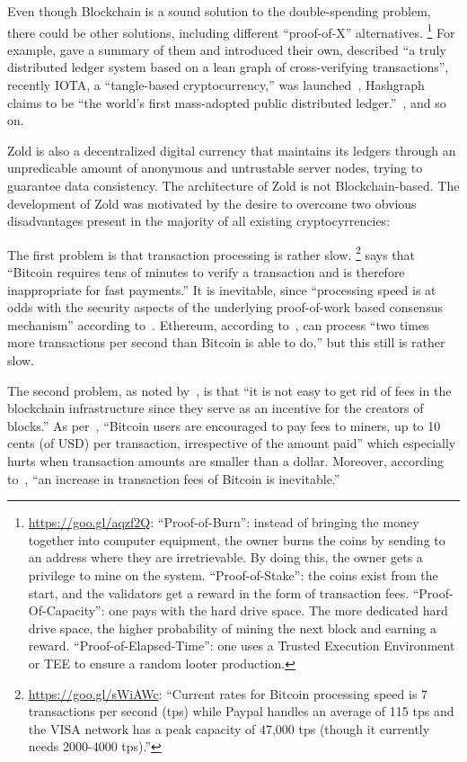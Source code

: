 \documentclass[11pt,oneside]{article}
\begin{document}
Even though Blockchain is a sound solution to the double-spending
problem, there could be other solutions,
including different ``proof-of-X'' alternatives.%
\footnote{%
  \url{https://goo.gl/aqzf2Q}:
  ``Proof-of-Burn'': instead of bringing the money together into computer equipment,
  the owner burns the coins by sending to an address where they are
  irretrievable. By doing this, the owner gets a privilege to
  mine on the system.
  ``Proof-of-Stake'': the coins exist from the start, and
  the validators get a reward in the form of transaction fees.
  ``Proof-Of-Capacity'': one pays with the hard drive space. The more
  dedicated hard drive space, the higher probability of mining
  the next block and earning a reward.
  ``Proof-of-Elapsed-Time'': one uses a Trusted Execution Environment or TEE
  to ensure a random looter production.
}
For example, \textcite{everaere2010} gave
a summary of them and introduced their own,
\textcite{boyen2016} described
``a truly distributed ledger system based on a lean graph of cross-verifying transactions'',
recently IOTA, a ``tangle-based cryptocurrency,'' was launched~\parencite{popov2017},
Hashgraph claims
to be ``the world's first mass-adopted public distributed ledger.''~\parencite{hashgraph},
and so on.

Zold is also a decentralized digital currency that maintains its ledgers
through an unpredicable amount of anonymous and untrustable server nodes, trying to guarantee
data consistency. The architecture of Zold is not Blockchain-based.
The development of Zold was motivated by the desire to overcome
two obvious disadvantages present in the majority of all existing cryptocyrrencies:

The first problem is that transaction processing is rather slow.%
\footnote{%
  \url{https://goo.gl/sWiAWc}:
  ``Current rates for Bitcoin processing
  speed is 7 transactions per second (tps) while Paypal handles
  an average of 115 tps and the VISA
  network has a peak capacity of 47,000 tps (though it currently needs 2000-4000 tps).''
}
\textcite{karame2012} says that ``Bitcoin requires tens of minutes to verify a transaction
and is therefore inappropriate for fast payments.''
It is inevitable, since
``processing speed is at odds with the security aspects of the underlying
proof-of-work based consensus mechanism'' according to~\textcite{kiayias2015}.
Ethereum, according to~\textcite{fekkes2018}, can process
``two times more transactions per second than Bitcoin is able to do,''
but this still is rather slow.

The second problem, as noted by~\textcite{popov2017}, is that ``it is not easy to get rid
of fees in the blockchain infrastructure since they serve
as an incentive for the creators of blocks.''
As per~\textcite{moser2015}, ``Bitcoin users are encouraged to
pay fees to miners, up to 10 cents (of USD) per transaction, irrespective of the
amount paid'' which especially hurts when transaction amounts are smaller than a dollar.
Moreover, according to~\textcite{kaskaloglu2014},
``an increase in transaction fees of Bitcoin is inevitable.''
\end{document}
